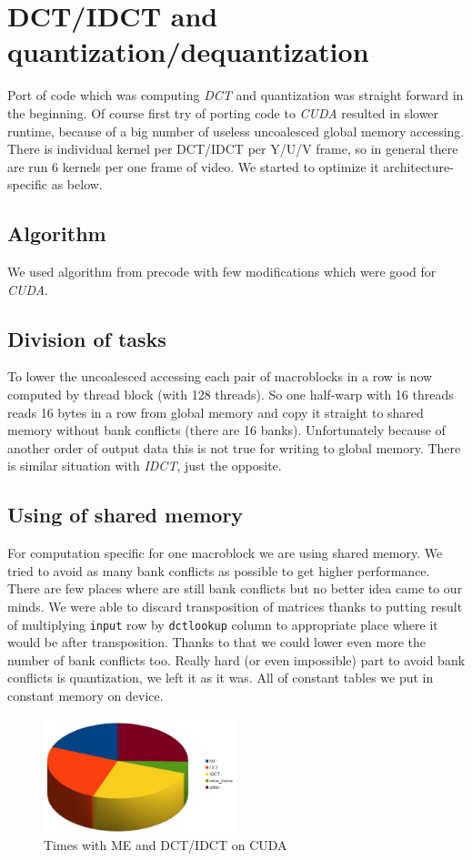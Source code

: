 \documentclass[11pt]{article}
\begin{document}
\section{DCT/IDCT and quantization/dequantization}
Port of code which was computing \emph{DCT} and quantization was straight forward in the beginning. Of course first try of porting code to \emph{CUDA} resulted in slower runtime, because of a big number of useless uncoalesced global memory accessing. There is individual kernel per DCT/IDCT per Y/U/V frame, so in general there are run 6 kernels per one frame of video. We started to optimize it architecture-specific as below.

\subsection{Algorithm}
We used algorithm from precode with few modifications which were good for \emph{CUDA}.

\subsection{Division of tasks}
To lower the uncoalesced accessing each pair of macroblocks in a row is now computed by thread block (with 128 threads). So one half-warp with 16 threads reads 16 bytes in a row from global memory and copy it straight to shared memory without bank conflicts (there are 16 banks). Unfortunately because of another order of output data this is not true for writing to global memory. There is similar situation with \emph{IDCT}, just the opposite.

\subsection{Using of shared memory}
For computation specific for one macroblock we are using shared memory. We tried to avoid as many bank conflicts as possible to get higher performance. There are few places where are still bank conflicts but no better idea came to our minds. We were able to discard transposition of matrices thanks to putting result of multiplying \texttt{input} row by \texttt{dctlookup} column to appropriate place where it would be after transposition. Thanks to that we could lower even more the number of bank conflicts too. Really hard (or even impossible) part to avoid bank conflicts is quantization, we left it as it was. All of constant tables we put in constant memory on device.

\begin{figure}[h]
\centering
\includegraphics[width=0.5\textwidth]{images/cuda_me.png}
\caption{Times with ME and DCT/IDCT on CUDA}
\end{figure}
\end{document}

